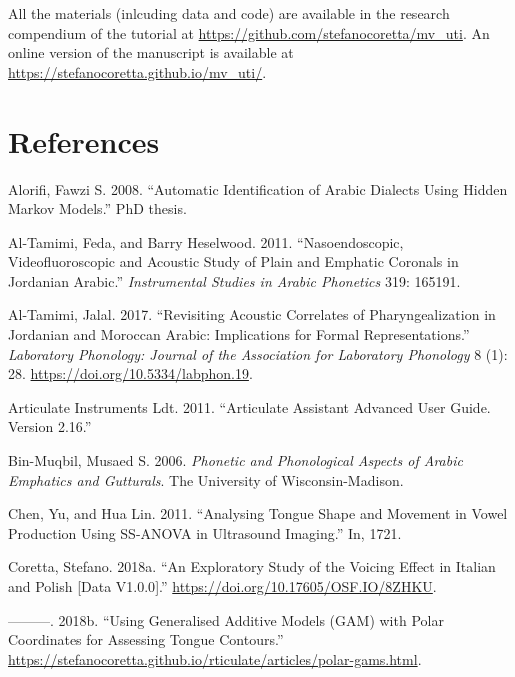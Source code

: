 \documentclass[
]{interact}
\newlength{\cslhangindent}
\newenvironment{CSLReferences}[2] %
 {\begin{list}{}{%
  \setlength{\itemindent}{0pt}
  \setlength{\leftmargin}{0pt}
  \setlength{\parsep}{0pt}
  \ifodd #1
   \setlength{\leftmargin}{\cslhangindent}
   \setlength{\itemindent}{-1\cslhangindent}
  \fi
  \setlength{\itemsep}{#2\baselineskip}}}
 {\end{list}}
\begin{document}
All the materials (inlcuding data and code) are available in the
research compendium of the tutorial at
\url{https://github.com/stefanocoretta/mv_uti}. An online version of the
manuscript is available at
\url{https://stefanocoretta.github.io/mv_uti/}.

\section{References}\label{references}

\label{refs}
\begin{CSLReferences}{1}{0}
Alorifi, Fawzi S. 2008. {``Automatic Identification of Arabic Dialects
Using Hidden Markov Models.''} PhD thesis.

Al-Tamimi, Feda, and Barry Heselwood. 2011. {``Nasoendoscopic,
Videofluoroscopic and Acoustic Study of Plain and Emphatic Coronals in
Jordanian Arabic.''} \emph{Instrumental Studies in Arabic Phonetics}
319: 165191.

Al-Tamimi, Jalal. 2017. {``Revisiting Acoustic Correlates of
Pharyngealization in Jordanian and Moroccan Arabic: Implications for
Formal Representations.''} \emph{Laboratory Phonology: Journal of the
Association for Laboratory Phonology} 8 (1): 28.
\url{https://doi.org/10.5334/labphon.19}.

Articulate Instruments Ldt. 2011. {``Articulate Assistant Advanced User
Guide. {Version} 2.16.''}

Bin-Muqbil, Musaed S. 2006. \emph{Phonetic and Phonological Aspects of
Arabic Emphatics and Gutturals}. The University of Wisconsin-Madison.

Chen, Yu, and Hua Lin. 2011. {``Analysing Tongue Shape and Movement in
Vowel Production Using SS-ANOVA in Ultrasound Imaging.''} In, 1721.

Coretta, Stefano. 2018a. {``An Exploratory Study of the Voicing Effect
in Italian and Polish {[}Data V1.0.0{]}.''}
\url{https://doi.org/10.17605/OSF.IO/8ZHKU}.

---------. 2018b. {``Using Generalised Additive Models (GAM) with Polar
Coordinates for Assessing Tongue Contours.''}
\url{https://stefanocoretta.github.io/rticulate/articles/polar-gams.html}.


\end{CSLReferences}
\end{document}
